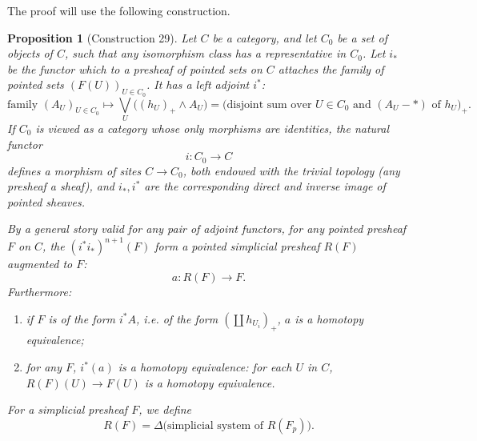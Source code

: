 \documentclass[11pt]{article}
\theoremstyle{deligne}
\newtheorem*{proposition*}{Proposition}
\begin{document}
The proof will use the following construction.

\begin{proposition*}[Construction 29]
Let \(C\) be a category, and let \(C_0\) be a set of objects of \(C\), such that any isomorphism class has a representative in \(C_0\). Let \(i_*\) be the functor which to a presheaf of pointed sets on \(C\) attaches the family of pointed sets \((F(U))_{U\in C_0}\). It has a left adjoint \(i^*\):
\[
\text{family }(A_U)_{U\in C_0}\longmapsto
\bigvee_U\bigl((h_U)_+\wedge A_U\bigr)
= \text{(disjoint sum over }U\in C_0\text{ and }(A_U-* )\text{ of }h_U)_+ .
\]
If \(C_0\) is viewed as a category whose only morphisms are identities, the natural functor
\[
i:C_0\longrightarrow C
\]
defines a morphism of sites \(C\to C_0\), both endowed with the trivial topology (any presheaf a sheaf), and \(i_*,i^*\) are the corresponding direct and inverse image of pointed sheaves.

By a general story valid for any pair of adjoint functors, for any pointed presheaf \(F\) on \(C\), the \((i^*i_*)^{n+1}(F)\) form a pointed simplicial presheaf \(R(F)\) augmented to \(F\):
\[
a:R(F)\longrightarrow F.
\]
Furthermore:
\begin{enumerate}[label=(\alph*)]
\item if \(F\) is of the form \(i^*A\), i.e. of the form \((\coprod h_{U_i})_+\), \(a\) is a homotopy equivalence;
\item for any \(F\), \(i^*(a)\) is a homotopy equivalence: for each \(U\) in \(C\), \(R(F)(U)\to F(U)\) is a homotopy equivalence.
\end{enumerate}
For a simplicial presheaf \(F\), we define
\[
R(F)=\Delta\bigl(\text{simplicial system of }R(F_p)\bigr).
\]
\end{proposition*}
\end{document}
